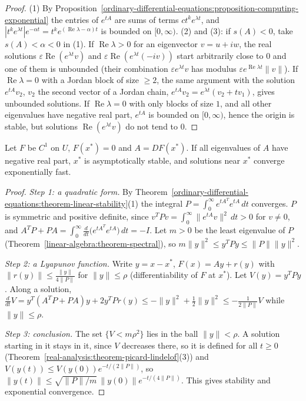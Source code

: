 \begin{proof}
(1) By Proposition~\ref{ordinary-differential-equations:proposition-computing-exponential} the entries of $e^{tA}$ are sums of terms $ct^ke^{\lambda t}$, and $|t^ke^{\lambda t}|e^{-\alpha t} = t^ke^{(\operatorname{Re}\lambda - \alpha)t}$ is bounded on
$[0, \infty)$. (2) and (3): if $s(A) < 0$, take $s(A) < \alpha < 0$ in (1). If $\operatorname{Re}\lambda > 0$ for an eigenvector $v = u + iw$, the real solutions $\varepsilon\operatorname{Re}(e^{\lambda t}v)$ and $\varepsilon\operatorname{Re}(e^{\lambda t}(-iv))$
start arbitrarily close to $0$ and one of them is unbounded (their combination $\varepsilon e^{\lambda t}v$ has modulus $\varepsilon e^{\operatorname{Re}\lambda t}\|v\|$). If $\operatorname{Re}\lambda = 0$ with a Jordan block of size $\geq 2$, the same
argument with the solution $e^{tA}v_2$, $v_2$ the second vector of a Jordan chain, $e^{tA}v_2 = e^{\lambda t}(v_2 + tv_1)$, gives unbounded solutions. If $\operatorname{Re}\lambda = 0$ with only blocks of size $1$, and all other eigenvalues have negative
real part, $e^{tA}$ is bounded on $[0, \infty)$, hence the origin is stable, but solutions $\operatorname{Re}(e^{\lambda t}v)$ do not tend to $0$.
\end{proof}

\begin{theorem}\label{ordinary-differential-equations:theorem-linearisation}
Let $F$ be $C^1$ on $U$, $F(x^*) = 0$ and $A = DF(x^*)$. If all eigenvalues of $A$ have negative real part, $x^*$ is asymptotically stable, and solutions near $x^*$ converge exponentially fast.
\end{theorem}

\begin{proof}
\emph{Step 1: a quadratic form.} By Theorem~\ref{ordinary-differential-equations:theorem-linear-stability}(1) the integral $P = \int_0^\infty e^{tA^T}e^{tA}\,dt$ converges. $P$ is symmetric and positive definite, since
$v^TPv = \int_0^\infty\|e^{tA}v\|^2\,dt > 0$ for $v \neq 0$, and $A^TP + PA = \int_0^\infty\frac{d}{dt}\bigl(e^{tA^T}e^{tA}\bigr)\,dt = -I$. Let $m > 0$ be the least eigenvalue of $P$ (Theorem~\ref{linear-algebra:theorem-spectral}), so
$m\|y\|^2 \leq y^TPy \leq \|P\|\|y\|^2$.

\emph{Step 2: a Lyapunov function.} Write $y = x - x^*$, $F(x) = Ay + r(y)$ with $\|r(y)\| \leq \frac{\|y\|}{4\|P\|}$ for $\|y\| \leq \rho$ (differentiability of $F$ at $x^*$). Let $V(y) = y^TPy$. Along a solution,
$\frac{d}{dt}V = y^T(A^TP + PA)y + 2y^TPr(y) \leq -\|y\|^2 + \frac12\|y\|^2 \leq -\frac{1}{2\|P\|}V$ while $\|y\| \leq \rho$.

\emph{Step 3: conclusion.} The set $\{V < m\rho^2\}$ lies in the ball $\|y\| < \rho$. A solution starting in it stays in it, since $V$ decreases there, so it is defined for all $t \geq 0$ (Theorem~\ref{real-analysis:theorem-picard-lindelof}(3))
and $V(y(t)) \leq V(y(0))e^{-t/(2\|P\|)}$, so $\|y(t)\| \leq \sqrt{\|P\|/m}\,\|y(0)\|e^{-t/(4\|P\|)}$. This gives stability and exponential convergence.
\end{proof}

